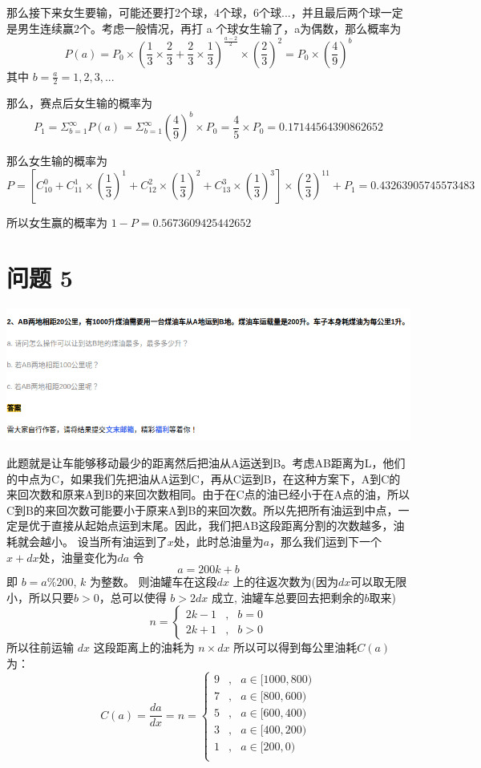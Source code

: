 \documentclass{article}
\begin{document}
那么接下来女生要输，可能还要打2个球，4个球，6个球...，并且最后两个球一定是男生连续赢2个。考虑一般情况，再打 a 个球女生输了，a为偶数，那么概率为
$$
P(a) = P_0 \times (\frac{1}{3} \times \frac{2}{3} + \frac{2}{3} \times \frac{1}{3})^{\frac{a-2}{2}} \times (\frac{2}{3})^2 = P_0 \times (\frac{4}{9})^b
$$
其中 $b=\frac{a}{2} = 1,2,3,...$

那么，赛点后女生输的概率为
$$
P_1 = \Sigma^{\infty}_{b=1} P(a) = \Sigma^{\infty}_{b=1}(\frac{4}{9})^b \times P_0 = \frac{4}{5} \times P_0 = 0.17144564390862652
$$

那么女生输的概率为
$$
P = [C^0_{10} + C^1_{11} \times (\frac{1}{3})^1 + C^2_{12} \times (\frac{1}{3})^2 + C^3_{13} \times (\frac{1}{3})^3] \times (\frac{2}{3})^{11} + P_1 = 0.43263905745573483
$$

所以女生赢的概率为 $ 1 - P = 0.5673609425442652 $

\newpage

\section{问题 5}

\includegraphics[scale=0.5]{oil.png}

此题就是让车能够移动最少的距离然后把油从A运送到B。考虑AB距离为L，他们的中点为C，如果我们先把油从A运到C，再从C运到B，在这种方案下，A到C的来回次数和原来A到B的来回次数相同。由于在C点的油已经小于在A点的油，所以C到B的来回次数可能要小于原来A到B的来回次数。所以先把所有油运到中点，一定是优于直接从起始点运到末尾。因此，我们把AB这段距离分割的次数越多，油耗就会越小。
设当所有油运到了$x$处，此时总油量为$a$，那么我们运到下一个$x+dx$处，油量变化为$da$
令 
$$ a = 200k+ b $$
即 $ b = a \% 200 $, $k$ 为整数。
则油罐车在这段$ dx $ 上的往返次数为(因为$dx$可以取无限小，所以只要$b > 0$，总可以使得 $b > 2dx$ 成立, 油罐车总要回去把剩余的$b$取来)
$$ 
n = \left\{
    \begin{aligned}
        2k - 1 & , & b = 0 \\
        2k + 1 & , & b > 0 
    \end{aligned}
\right.
$$
所以往前运输 $dx$ 这段距离上的油耗为 $n \times dx$ 所以可以得到每公里油耗$C(a)$为：
$$
C(a) = \frac{da}{dx} = n = 
\left\{
    \begin{aligned}
        9 & , & a \in [1000, 800) \\
        7 & , & a \in [800, 600) \\ 
        5 & , & a \in [600, 400) \\
        3 & , & a \in [400, 200) \\
        1 & , & a \in [200, 0) \\
    \end{aligned}
\right.
$$
\end{document}

